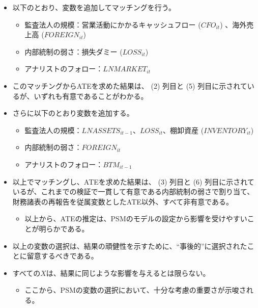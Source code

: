 \begin{itemize}
 \item 以下のとおり、変数を追加してマッチングを行う。
  \begin{itemize}
   \item 監査法人の規模：営業活動にかかるキャッシュフロー ($\mathit{CFO}_{it}$) 、海外売上高 ($\mathit{FOREIGN}_{it}$) 
   \item 内部統制の弱さ：損失ダミー ($\mathit{LOSS}_{it}$) 
   \item アナリストのフォロー：$\mathit{LNMARKET}_{it}$
  \end{itemize}
 \item このマッチングからATEを求めた結果は、 (2) 列目と (5) 列目に示されているが、いずれも有意であることがわかる。
 \item さらに以下のとおり変数を追加する。
  \begin{itemize}
   \item 監査法人の規模：$\mathit{LNASSETS}_{it-1}$、$LOSS_{it}$、棚卸資産 ($\mathit{INVENTORY}_{it}$) 
   \item 内部統制の弱さ：$\mathit{FOREIGN}_{it}$
   \item アナリストのフォロー：$\mathit{BTM}_{it-1}$
  \end{itemize}
 \item 以上でマッチングし、ATEを求めた結果は、 (3) 列目と (6) 列目に示されているが、これまでの検証で一貫して有意である内部統制の弱さで割り当て、財務諸表の再報告を従属変数としたATE以外、すべて非有意である。
  \begin{itemize}
   \item 以上から、ATEの推定は、PSMのモデルの設定から影響を受けやすいことが明らかである。
  \end{itemize}
 \item 以上の変数の選択は、結果の頑健性を示すために、``事後的''に選択されたことに留意するべきである。
 \item すべての$X$は、結果に同じような影響を与えるとは限らない。
  \begin{itemize}
   \item ここから、PSMの変数の選択において、十分な考慮の重要さが示唆される。
  \end{itemize}
\end{itemize}
